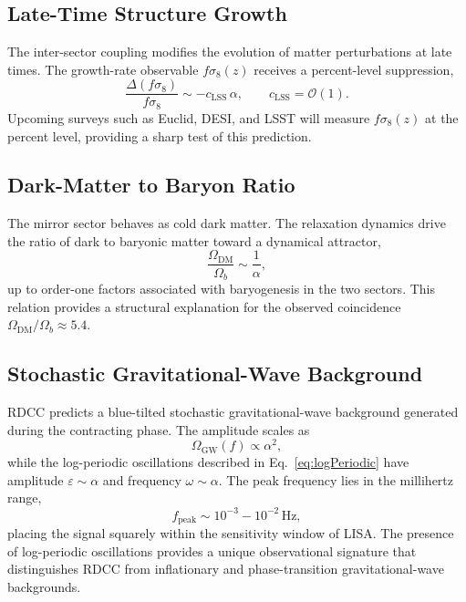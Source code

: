 \documentclass[11pt,a4paper]{article}
\begin{document}
\subsection{Late-Time Structure Growth}

The inter-sector coupling modifies the evolution of matter perturbations at late
times. The growth-rate observable \(f\sigma_{8}(z)\) receives a percent-level
suppression,
\begin{equation}
    \frac{\Delta(f\sigma_{8})}{f\sigma_{8}}
    \sim -c_{\mathrm{LSS}}\,\alpha,
    \qquad
    c_{\mathrm{LSS}} = \mathcal{O}(1).
\end{equation}
Upcoming surveys such as Euclid, DESI, and LSST will measure \(f\sigma_{8}(z)\)
at the percent level, providing a sharp test of this prediction.


\subsection{Dark-Matter to Baryon Ratio}

The mirror sector behaves as cold dark matter. The relaxation dynamics drive the
ratio of dark to baryonic matter toward a dynamical attractor,
\begin{equation}
    \frac{\Omega_{\mathrm{DM}}}{\Omega_{b}}
    \sim \frac{1}{\alpha},
\end{equation}
up to order-one factors associated with baryogenesis in the two sectors. This
relation provides a structural explanation for the observed coincidence
\(\Omega_{\mathrm{DM}}/\Omega_{b} \approx 5.4\).


\subsection{Stochastic Gravitational-Wave Background}

RDCC predicts a blue-tilted stochastic gravitational-wave background generated
during the contracting phase. The amplitude scales as
\begin{equation}
    \Omega_{\mathrm{GW}}(f) \propto \alpha^{2},
\end{equation}
while the log-periodic oscillations described in Eq.~\eqref{eq:logPeriodic}
have amplitude \(\varepsilon \sim \alpha\) and frequency \(\omega \sim \alpha\).
The peak frequency lies in the millihertz range,
\begin{equation}
    f_{\mathrm{peak}} \sim 10^{-3} - 10^{-2}\,\mathrm{Hz},
\end{equation}
placing the signal squarely within the sensitivity window of LISA. The presence
of log-periodic oscillations provides a unique observational signature that
distinguishes RDCC from inflationary and phase-transition gravitational-wave
backgrounds.
\end{document}
